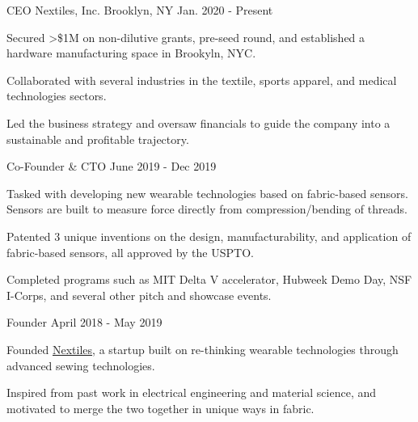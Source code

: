 
\newcommand{\patents}{3}
\newcommand{\raised}{1M}

\begin{cventries}

\cventry
    {CEO} %
    {Nextiles, Inc.} %
    {Brooklyn, NY} %
    {Jan. 2020 - Present} %
    {
      \begin{cvitems} %
        \item {Secured >\$\raised{} on non-dilutive grants, pre-seed round, and established a hardware manufacturing space in Brookyln, NYC.}
        \item {Collaborated with several industries in the textile, sports apparel, and medical technologies sectors.}
        \item {Led the business strategy and oversaw financials to guide the company into a sustainable and profitable trajectory.}
      \end{cvitems}
    }

\cventry
    {Co-Founder \& CTO} %
    {} %
    {} %
    {June 2019 - Dec 2019} %
    {
      \begin{cvitems} %
        \item {Tasked with developing new wearable technologies based on fabric-based sensors. Sensors are built to measure force directly from compression/bending of threads.}
        \item {Patented \patents{} unique inventions on the design, manufacturability, and application of fabric-based sensors, all approved by the USPTO.}
        \item {Completed programs such as MIT Delta V accelerator, Hubweek Demo Day, NSF I-Corps, and several other pitch and showcase events.}
      \end{cvitems}
    }

\cventry
    {Founder} %
    {} %
    {} %
    {April 2018 - May 2019}
    {
      \begin{cvitems} %
        \item {Founded \href{www.Nextiles.tech}{Nextiles}, a startup built on re-thinking wearable technologies through advanced sewing technologies.}
        \item {Inspired from past work in electrical engineering and material science, and motivated to merge the two together in unique ways in fabric.}
      \end{cvitems}
    }


\end{cventries}
